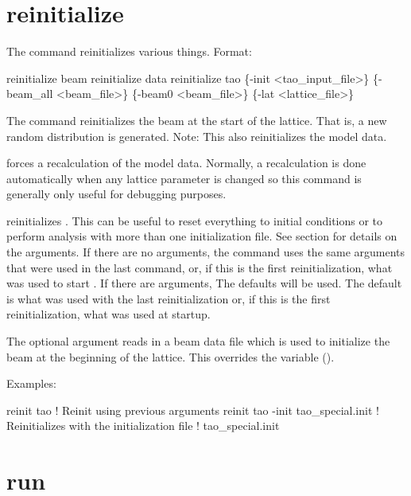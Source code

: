 \section{reinitialize}
\label{s:reinit}

The  command reinitializes various things. Format:
\begin{example}
  reinitialize beam
  reinitialize data
  reinitialize tao \{-init <tao_input_file>\} \{-beam_all <beam_file>\} 
                          \{-beam0 <beam_file>\} \{-lat <lattice_file>\}
\end{example}

\vskip 0.2in 

The  command reinitializes the beam at the start
of the lattice. That is, a new random distribution is generated. 
Note: This also reinitializes the model data.

 forces a recalculation of the model data.
Normally, a recalculation is done automatically when any lattice
parameter is changed so this command is generally only useful for
debugging purposes.

 reinitializes \tao. This can be useful to reset
everything to initial conditions or to perform analysis with more than
one initialization file.  See section  for
details on the arguments.  If there are no arguments, the
 command uses the same arguments that were used in
the last  command, or, if this is the first
reinitialization, what was used to start \tao. If there are arguments,
The defaults will be used.  The default  is what was
used with the last reinitialization or, if this is the first
reinitialization, what was used at startup.

The  optional argument reads in a beam data file which is
used to initialize the beam at the beginning of the lattice. This
overrides the  variable ().

Examples:
\begin{example}
  reinit tao                         ! Reinit using previous arguments
  reinit tao -init tao_special.init  ! Reinitializes \tao with the initialization file 
                                     !   tao_special.init
\end{example}


\section{run}
\label{s:run}

